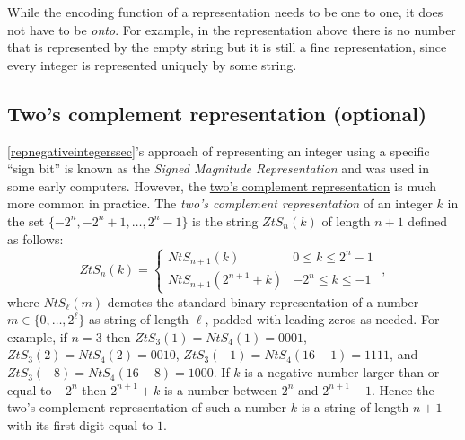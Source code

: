 While the encoding function of a representation needs to be one to one,
it does not have to be \emph{onto}. For example, in the representation
above there is no number that is represented by the empty string but it
is still a fine representation, since every integer is represented
uniquely by some string.

\hypertarget{contextreprem}{}

\subsection{Two's complement representation
(optional)}\label{twoscomplement}

\cref{repnegativeintegerssec}'s approach of representing an integer
using a specific ``sign bit'' is known as the \emph{Signed Magnitude
Representation} and was used in some early computers. However, the
\href{https://en.wikipedia.org/wiki/Two\%27s\%5Fcomplement}{two's
complement representation} is much more common in practice. The
\emph{two's complement representation} of an integer \(k\) in the set
\(\{ -2^n , -2^n+1, \ldots, 2^n-1 \}\) is the string \(ZtS_n(k)\) of
length \(n+1\) defined as follows: \[
ZtS_n(k) = \begin{cases} NtS_{n+1}(k) & 0 \leq k \leq 2^n-1 \\
                     NtS_{n+1}(2^{n+1}+k) & -2^n \leq k \leq -1 \end{cases} \;,
\] where \(NtS_\ell(m)\) demotes the standard binary representation of a
number \(m \in \{0,\ldots, 2^{\ell}\}\) as string of length \(\ell\),
padded with leading zeros as needed. For example, if \(n=3\) then
\(ZtS_3(1)=NtS_4(1)=0001\), \(ZtS_3(2)=NtS_4(2)=0010\),
\(ZtS_3(-1)=NtS_4(16-1)=1111\), and \(ZtS_3(-8)=NtS_4(16-8)=1000\). If
\(k\) is a negative number larger than or equal to \(-2^n\) then
\(2^{n+1}+k\) is a number between \(2^n\) and \(2^{n+1}-1\). Hence the
two's complement representation of such a number \(k\) is a string of
length \(n+1\) with its first digit equal to \(1\).

